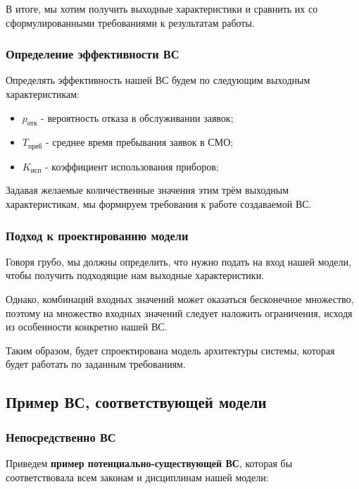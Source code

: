\documentclass[a4paper, 14pt]{article}
\begin{document}
В итоге, мы хотим получить выходные характеристики и сравнить их со сформулированными требованиями к результатам работы.

\subsubsection{Определение эффективности ВС}

Определять эффективность нашей ВС будем по следующим выходным характеристикам:

\begin{itemize}
	\item $p_\text{отк}$ - вероятность отказа в обслуживании заявок;
	\item $T_\text{преб}$ - среднее время пребывания заявок в СМО;
	\item $K_\text{исп}$ - коэффициент использования приборов;
\end{itemize}

Задавая желаемые количественные значения этим трём выходным характеристикам, мы формируем требования к работе создаваемой ВС.

\subsubsection{Подход к проектированию модели}

Говоря грубо, мы должны определить, что нужно подать на вход нашей модели, чтобы получить подходящие нам выходные характеристики.

Однако, комбинаций входных значений может оказаться бесконечное множество, поэтому на множество входных значений следует наложить ограничения, исходя из особенности конкретно нашей ВС.

Таким образом, будет спроектирована модель архитектуры системы, которая будет работать по заданным требованиям.

\subsection{Пример ВС, соответствующей модели}

\subsubsection{Непосредственно ВС}

Приведем \textbf{пример потенциально-существующей ВС}, которая бы соответствовала всем законам и дисциплинам нашей модели:
\end{document}
